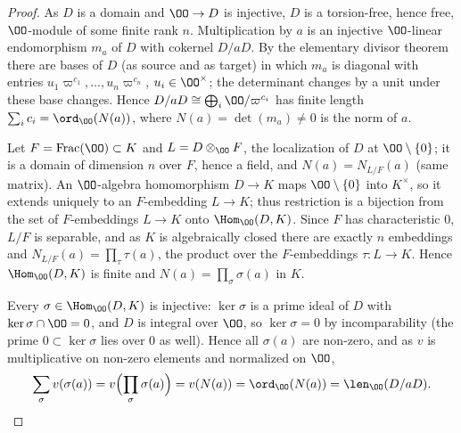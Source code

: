 \begin{proof}
As $D$ is a domain and $\OO\to D$ is injective, $D$ is a torsion-free, hence free, $\OO$-module of some finite rank
$n$. Multiplication by $a$ is an injective $\OO$-linear endomorphism $m_a$ of $D$ with cokernel $D/aD$. By the
elementary divisor theorem there are bases of $D$ (as source and as target) in which $m_a$ is diagonal with entries
$u_1\varpi^{c_1},\dots,u_n\varpi^{c_n}$, $u_i\in\OO^\times$; the determinant changes by a unit under these base
changes. Hence $D/aD\cong\bigoplus_i\OO/\varpi^{c_i}$ has finite length $\sum_ic_i=\ord_\OO(N(a))$, where
$N(a)=\det(m_a)\ne0$ is the norm of $a$.

Let $F=\mathrm{Frac}(\OO)\subset K$ and $L=D\otimes_\OO F$, the localization of $D$ at $\OO\setminus\{0\}$; it is a
domain of dimension $n$ over $F$, hence a field, and $N(a)=N_{L/F}(a)$ (same matrix). An $\OO$-algebra homomorphism
$D\to K$ maps $\OO\setminus\{0\}$ into $K^\times$, so it extends uniquely to an $F$-embedding $L\to K$; thus
restriction is a bijection from the set of $F$-embeddings $L\to K$ onto $\Hom_\OO(D,K)$. Since $F$ has
characteristic $0$, $L/F$ is separable, and as $K$ is algebraically closed there are exactly $n$ embeddings and
$N_{L/F}(a)=\prod_\tau\tau(a)$, the product over the $F$-embeddings $\tau:L\to K$. Hence $\Hom_\OO(D,K)$ is finite and
$N(a)=\prod_\sigma\sigma(a)$ in $K$.

Every $\sigma\in\Hom_\OO(D,K)$ is injective: $\ker\sigma$ is a prime ideal of $D$ with $\ker\sigma\cap\OO=0$, and $D$
is integral over $\OO$, so $\ker\sigma=0$ by incomparability (the prime $0\subset\ker\sigma$ lies over $0$ as well).
Hence all $\sigma(a)$ are non-zero, and as $v$ is multiplicative on non-zero elements and normalized on $\OO$,
\[
 \sum_\sigma v(\sigma(a))=v\Bigl(\prod_\sigma\sigma(a)\Bigr)=v(N(a))=\ord_\OO(N(a))=\len_\OO(D/aD).\qedhere
\]
\end{proof}

